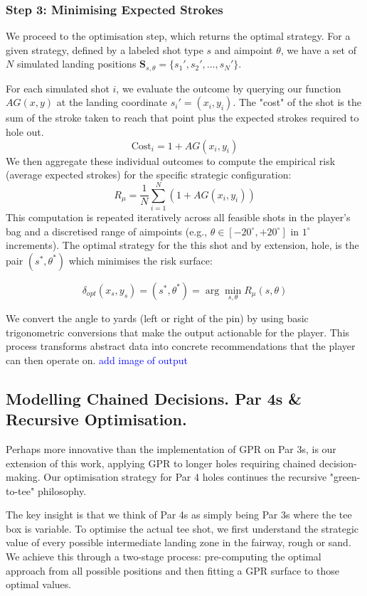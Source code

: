\documentclass[11pt, letterpaper]{article}
\begin{document}
\subsubsection{Step 3: Minimising Expected Strokes}

We proceed to the optimisation step, which returns the optimal strategy. For a given strategy, defined by a labeled shot type $s$ and aimpoint $\theta$, we have a set of $N$ simulated landing positions $\mathbf{S}_{s,\theta} = \{s_1', s_2', \ldots, s_N'\}$. 

For each simulated shot $i$, we evaluate the outcome by querying our function $AG(x,y)$ at the landing coordinate $s_i' = (x_i, y_i)$. The "cost" of the shot is the sum of the stroke taken to reach that point plus the expected strokes required to hole out.
$$\text{Cost}_i = 1 + AG(x_i, y_i)$$
We then aggregate these individual outcomes to compute the empirical risk (average expected strokes) for the specific strategic configuration:
$$R_\mu = \frac{1}{N} \sum ^N_{i=1} (1+AG(x_i, y_i))$$
This computation is repeated iteratively across all feasible shots in the player's bag and a discretised range of aimpoints (e.g., $\theta \in [-20^\circ, +20^\circ]$ in $1^\circ$ increments). The optimal strategy for the this shot and by extension, hole, is the pair $(s^*, \theta^*)$ which minimises the risk surface:

$$\delta_{opt} (x_s, y_s) = (s^*, \theta^*) = \arg \min_{s, \theta} R_\mu(s, \theta)$$

We convert the angle to yards (left or right of the pin) by using basic trigonometric conversions that make the output actionable for the player. This process transforms abstract data into concrete recommendations that the player can then operate on.
\textcolor{blue}{add image of output}

\subsection{Modelling Chained Decisions. Par 4s \& Recursive Optimisation.}
Perhaps more innovative than the implementation of GPR on Par 3s, is our extension of this work, applying GPR to longer holes requiring chained decision-making. Our optimisation strategy for Par 4 holes continues the recursive "green-to-tee" philosophy. 

The key insight is that we think of Par 4s as simply being Par 3s where the tee box is variable. To optimise the actual tee shot, we first understand the strategic value of every possible intermediate landing zone in the fairway, rough or sand. We achieve this through a two-stage process: pre-computing the optimal approach from all possible positions and then fitting a GPR surface to those optimal values.
\end{document}
